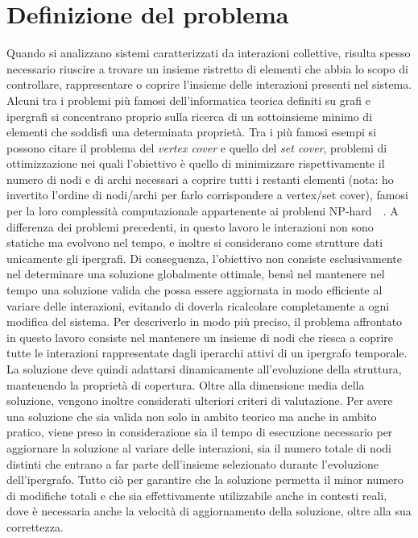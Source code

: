 
\section{Definizione del problema}\label{sec:definizione_del_problema}

Quando si analizzano sistemi caratterizzati da interazioni collettive, risulta spesso necessario riuscire a trovare un insieme ristretto di elementi che abbia lo scopo di controllare, rappresentare o coprire l'insieme delle interazioni presenti nel sistema.
Alcuni tra i problemi più famosi dell'informatica teorica definiti su grafi e ipergrafi si concentrano proprio sulla ricerca di un sottoinsieme minimo di elementi che soddisfi una determinata proprietà. Tra i più famosi esempi si possono citare il problema del \textit{vertex cover} e quello del \textit{set cover}, problemi di ottimizzazione nei quali l'obiettivo è quello di minimizzare rispettivamente il numero di nodi e di archi necessari a coprire tutti i restanti elementi (nota: ho invertito l'ordine di nodi/archi per farlo corrispondere a vertex/set cover), famosi per la loro complessità computazionale appartenente ai problemi NP-hard~\cite{garey1979}~\cite{gomes2006}.
A differenza dei problemi precedenti, in questo lavoro le interazioni non sono statiche ma evolvono nel tempo, e inoltre si considerano come strutture dati unicamente gli ipergrafi.
Di conseguenza, l'obiettivo non consiste esclusivamente nel determinare una soluzione globalmente ottimale, bensì nel mantenere nel tempo una soluzione valida che possa essere aggiornata in modo efficiente al variare delle interazioni, evitando di doverla ricalcolare completamente a ogni modifica del sistema.
Per descriverlo in modo più preciso, il problema affrontato in questo lavoro consiste nel mantenere un insieme di nodi che riesca a coprire tutte le interazioni rappresentate dagli iperarchi attivi di un ipergrafo temporale.
La soluzione deve quindi adattarsi dinamicamente all'evoluzione della struttura, mantenendo la proprietà di copertura.
Oltre alla dimensione media della soluzione, vengono inoltre considerati ulteriori criteri di valutazione.
Per avere una soluzione che sia valida non solo in ambito teorico ma anche in ambito pratico, viene preso in considerazione sia il tempo di esecuzione necessario per aggiornare la soluzione al variare delle interazioni, sia il numero totale di nodi distinti che entrano a far parte dell'insieme selezionato durante l'evoluzione dell'ipergrafo.
Tutto ciò per garantire che la soluzione permetta il minor numero di modifiche totali e che sia effettivamente utilizzabile anche in contesti reali, dove è necessaria anche la velocità di aggiornamento della soluzione, oltre alla sua correttezza.